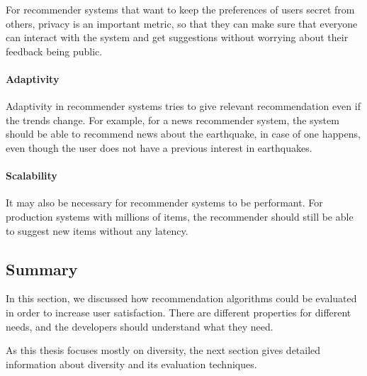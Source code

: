 For recommender systems that want to keep the preferences of users secret from others, privacy is an important metric, so that they can make sure that everyone can interact with the system and get suggestions without worrying about their feedback being public.

\paragraph{Adaptivity}

Adaptivity in recommender systems tries to give relevant recommendation even if the trends change. For example, for a news recommender system, the system should be able to recommend news about the earthquake, in case of one happens, even though the user does not have a previous interest in earthquakes.

\paragraph{Scalability}

It may also be necessary for recommender systems to be performant. For production systems with millions of items, the recommender should still be able to suggest new items without any latency.

\subsection{Summary}

In this section, we discussed how recommendation algorithms could be evaluated in order to increase user satisfaction. There are different properties for different needs, and the developers should understand what they need.

As this thesis focuses mostly on diversity, the next section gives detailed information about diversity and its evaluation techniques.


